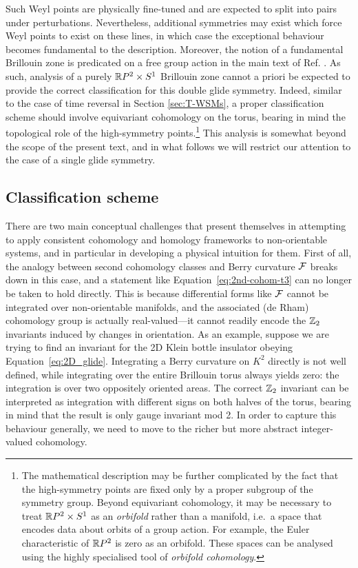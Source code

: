 Such Weyl points are physically fine-tuned and are expected to split into pairs under perturbations. Nevertheless, additional symmetries may exist which force Weyl points to exist on these lines, in which case the exceptional behaviour becomes fundamental to the description. %
Moreover, the notion of a fundamental Brillouin zone is predicated on a free group action in the main text of Ref. \cite{Fonseca-Vaidya_nonorientable}. As such, analysis of a purely $\mathbb{R} P^2\times S^1$ Brillouin zone cannot a priori be expected to provide the correct classification for this double glide symmetry. Indeed, similar to the case of time reversal in Section \ref{sec:T-WSMs}, a proper classification scheme should involve equivariant cohomology on the torus, bearing in mind the topological role of the high-symmetry points.\footnote{
	The mathematical description may be further complicated by the fact that the high-symmetry points are fixed only by a proper subgroup of the symmetry group. Beyond equivariant cohomology, it may be necessary to treat $\mathbb{R} P^2\times S^1$ as an \emph{orbifold} rather than a manifold, i.e.\ a space that encodes data about orbits of a group action. For example, the Euler characteristic of $\mathbb{R} P^2$ is zero as an orbifold. These spaces can be analysed using the highly specialised tool of \emph{orbifold cohomology}. } %
This analysis is somewhat beyond the scope of the present text, and in what follows we will restrict our attention to the case of a single glide symmetry.

\subsection{Classification scheme}

There are two main conceptual challenges that present themselves in attempting to apply consistent cohomology and homology frameworks to non-orientable systems, and in particular in developing a physical intuition for them. First of all, the analogy between second cohomology classes and Berry curvature $\mathcal{F}$ breaks down in this case, and a statement like Equation~\eqref{eq:2nd-cohom-t3} can no longer be taken to hold directly. %
This is because differential forms like $\mathcal{F}$ cannot be integrated over non-orientable manifolds, and the associated (de Rham) cohomology group is actually real-valued---it cannot readily encode the $\mathbb{Z}_2$ invariants induced by changes in orientation. As an example, suppose we are trying to find an invariant for the 2D Klein bottle insulator obeying Equation~\eqref{eq:2D_glide}. Integrating a Berry curvature on $K^2$ directly is not well defined, while integrating over the entire Brillouin torus always yields zero: the integration is over two oppositely oriented areas. The correct $\mathbb{Z}_2$ invariant can be interpreted as integration with different signs on both halves of the torus, bearing in mind that the result is only gauge invariant mod 2. In order to capture this behaviour generally, we need to move to the richer but more abstract integer-valued cohomology. %

